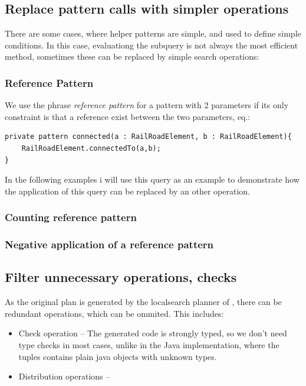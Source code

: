 \subsection{Replace pattern calls with simpler operations}
There are some cases, where helper patterns are simple, and used to define simple conditions. In this case, evaluationg the subquery is not always the most efficient method, sometimes these can be replaced by simple search operations:

\subsubsection{Reference Pattern}
We use the phrase \emph{reference pattern} for a pattern with 2 parameters if its only constraint is that a reference exist between the two parameters, eq.:
\begin{lstlisting}[language = vql]
private pattern connected(a : RailRoadElement, b : RailRoadElement){
	RailRoadElement.connectedTo(a,b);
}
\end{lstlisting}
In the following examples i will use this query as an example to demonstrate how the application of this query can be replaced by an other operation.

\subsubsection{Counting reference pattern}
\subsubsection{Negative application of a reference pattern}

\subsection{Filter unnecessary operations, checks}
As the original plan is generated by the localsearch planner of \viatra{}, there can be redundant operations, which can be ommited. This includes:

\begin{itemize}
	\item Check operation -- The generated code is strongly typed, so we don't need type checks in most cases, unlike in the Java implementation, where the tuples contains plain java objects with unknown types.
	
	\item Distribution operations -- 
\end{itemize}



